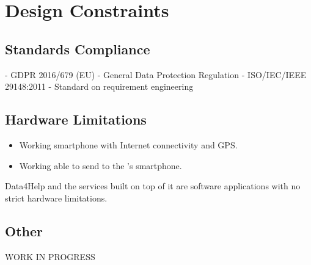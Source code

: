 \documentclass[../../rasd.tex]{subfiles}
\begin{document}
\section{Design Constraints}
			\subsection{Standards Compliance}
				- GDPR 2016/679 (EU) - General Data Protection Regulation
				- ISO/IEC/IEEE 29148:2011 - Standard on requirement engineering
			\subsection{Hardware Limitations}
				\begin{itemize}
					\item Working smartphone with Internet connectivity and GPS.
					\item Working  able to send  to the 's smartphone.
				\end{itemize}
				Data4Help and the services built on top of it are software applications with no strict hardware limitations.
			\subsection{Other}
			WORK IN PROGRESS
\end{document}
